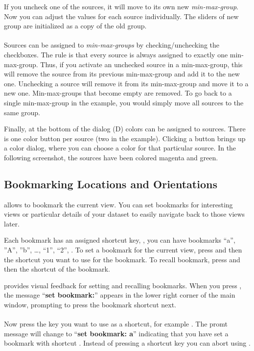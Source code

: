 \documentclass{scrartcl}
\begin{document}
If you uncheck one of the sources, it will move to its own new \emph{min-max-group}.
Now you can adjust the values for each source individually.
The sliders of new group are initialized as a copy of the old group.
\\
\\
Sources can be assigned to \emph{min-max-groups} by checking/unchecking the checkboxes.
The rule is that every source is always assigned to exactly one min-max-group.
Thus, if you activate an unchecked source in a min-max-group, this will remove the source from its previous min-max-group and add it to the new one.
Unchecking a source will remove it from its min-max-group and move it to a new one.
Min-max-groups that become empty are removed.
To go back to a single min-max-group in the example, you would simply move all sources to the same group.

Finally, at the bottom of the dialog (D) colors can be assigned to sources.
There is one color button per source (two in the example).
Clicking a button brings up a color dialog, where you can choose a color for that particular source.
In the following screenshot, the sources have been colored magenta and green.
\\

%
\subsection{Bookmarking Locations and Orientations}
\Bdv allows to bookmark the current view.
You can set bookmarks for interesting views or particular details of your dataset to easily navigate back to those views later.

Each bookmark has an assigned shortcut key, \ie, you can have bookmarks ``a'', ''A'', ''b'', \dots, ``1'', ``2'', \etc.
To set a bookmark for the current view, press  and then the shortcut you want to use for the bookmark.
To recall bookmark, press  and then the shortcut of the bookmark.

\Bdv provides visual feedback for setting and recalling bookmarks.
When you press , the message ``\textbf{set bookmark:}'' appears in the lower right corner of the main window, prompting to press the bookmark shortcut next.
\\
\\
Now press the key you want to use as a shortcut, for example .
The promt message will change to ``\textbf{set bookmark: a}'' indicating that you have set a bookmark with shortcut .
Instead of pressing a shortcut key you can abort using .
\end{document}
